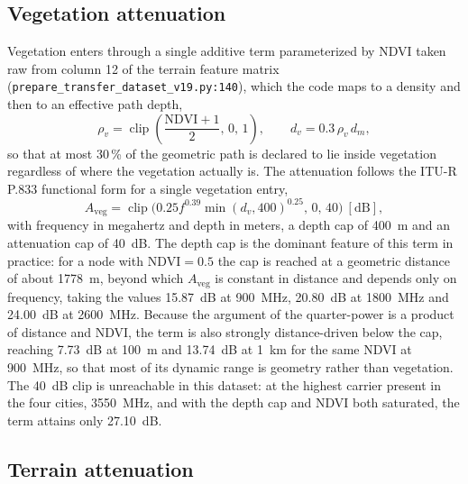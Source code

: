 \subsection{Vegetation attenuation}

Vegetation enters through a single additive term parameterized by NDVI
taken raw from column 12 of the terrain feature matrix
(\texttt{prepare\_\allowbreak{}transfer\_\allowbreak{}dataset\_\allowbreak{}v19.py:\allowbreak{}140}), which the code maps to a
density and then to an effective path depth,
\begin{equation}
\rho_{v} = \operatorname{clip}\!\left(\frac{\mathrm{NDVI}+1}{2},\,0,\,1\right),
\qquad
d_{v} = 0.3\, \rho_{v}\, d_{m} ,
\label{eq:app-vegdepth}
\end{equation}
so that at most 30\,\% of the geometric path is declared to lie inside
vegetation regardless of where the vegetation actually is. The attenuation
follows the ITU-R P.833 functional form for a single vegetation entry,
\begin{equation}
A_{\mathrm{veg}} = \operatorname{clip}\!\bigl(
0.25 f^{0.39} \min(d_{v}, 400)^{0.25},\, 0,\, 40 \bigr)\ [\mathrm{dB}] ,
\label{eq:app-aveg}
\end{equation}
with frequency in megahertz and depth in meters, a depth cap of 400~m and
an attenuation cap of 40~dB. The depth cap is the dominant feature of this
term in practice: for a node with $\mathrm{NDVI}=0.5$ the cap is reached at
a geometric distance of about 1778~m, beyond which $A_{\mathrm{veg}}$ is
constant in distance and depends only on frequency, taking the values
15.87~dB at 900~MHz, 20.80~dB at 1800~MHz and 24.00~dB at 2600~MHz.
Because the argument of the quarter-power is a product of distance and
NDVI, the term is also strongly distance-driven below the cap, reaching
7.73~dB at 100~m and 13.74~dB at 1~km for the same NDVI at 900~MHz, so that
most of its dynamic range is geometry rather than vegetation. The 40~dB
clip is unreachable in this dataset: at the highest carrier present in the
four cities, 3550~MHz, and with the depth cap and NDVI both saturated, the
term attains only 27.10~dB.

\subsection{Terrain attenuation}

